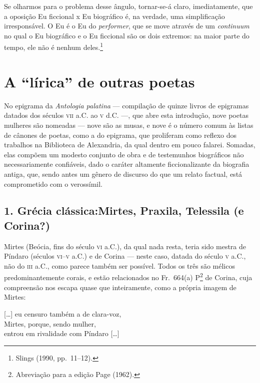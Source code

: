 \begin{hedraquote}
Se olharmos para o problema desse ângulo, tornar-se-á claro, imediatamente, que
a oposição Eu ficcional x Eu biográfico é, na verdade, uma simplificação
irresponsável. O Eu é o Eu do \textit{performer}, que se move através de um
\textit{continuum} no qual o Eu biográfico e o Eu ficcional são os dois
extremos: na maior parte do tempo, ele não é nenhum deles.\footnote{ Slings (1990, pp.~11--12).}
\end{hedraquote}

\section{A “lírica” de outras poetas}

No epigrama da \textit{Antologia palatina} --- compilação de quinze livros de
epigramas datados dos séculos \textsc{vii} a.C. ao \textsc{v} d.C. ---, que abre esta introdução,
nove poetas mulheres são nomeadas --- nove são as musas, e nove é o número comum
às listas de cânones de poetas, como a do epigrama, que proliferam como reflexo
dos trabalhos na Biblioteca de Alexandria, da qual dentro em pouco falarei.
Somadas, elas compõem um modesto conjunto de obra e de testemunhos biográficos
não necessariamente confiáveis, dado o caráter altamente ficcionalizante da
biografia antiga, que, sendo antes um gênero de discurso do que um relato
factual, está comprometido com o verossímil.

\subsection{1. Grécia clássica:\break Mirtes, Praxila, Telessila (e
Corina?)}

\smallskip

Mirtes (Beócia, fins do século \textsc{vi} a.C.), da qual nada resta, teria sido mestra
de Píndaro (séculos \textsc{vi}--\textsc{v} a.C.) e de Corina --- neste caso, datada do século \textsc{v}
a.C., não do \textsc{iii} a.C., como parece também ser possível. Todos os três são
mélicos predominantemente corais, e estão relacionados no Fr.~664(a)
P\footnote{ Abreviação para a edição Page (1962).}  de Corina, cuja compreensão
nos escapa quase que inteiramente, como a própria imagem de Mirtes:


\begin{hedraquote}
\mbox[\ldots{}] eu censuro também a de clara-voz,\\
Mirtes, porque, sendo mulher,\\
entrou em rivalidade com Píndaro [\ldots{}]
\end{hedraquote}


